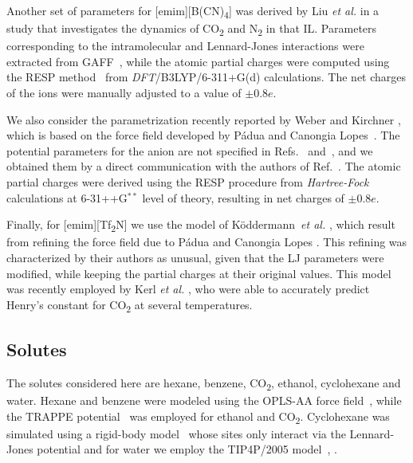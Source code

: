 \documentclass[3p,twocolumn]{elsarticle}
\begin{document}
Another set of parameters for \mbox{[emim][B(CN)\textsubscript{4}]} was derived by Liu \textit{et al.}\cite{Liu_2014} in a study that investigates the dynamics of CO\textsubscript{2} and N\textsubscript{2} in that IL. Parameters corresponding to the intramolecular and Lennard-Jones interactions were extracted from GAFF~\cite{Wang_2004}, while the atomic partial charges were computed using the RESP method~\cite{Bayly_1993} from \textit{DFT}/B3LYP/6-311+G(d) calculations. The net charges of the ions were manually adjusted to a value of $\pm$0.8$e$.

We also consider the parametrization recently reported by Weber and Kirchner \cite{Weber_2016}, which is based on the force field developed by P{\'{a}}dua and Canongia Lopes~\cite{Canongia_Lopes_2006}. The potential parameters for the anion are not specified in Refs.~ and~, and we obtained them by a direct communication with the authors of Ref.~. The atomic partial charges were derived using the RESP procedure from \textit{Hartree-Fock} calculations at 6-31++G$^{\ast \ast}$ level of theory, resulting in net charges of $\pm$0.8$e$.

Finally, for [emim][Tf\textsubscript{2}N] we use the model of K\"{o}ddermann~\textit{et al.} \cite{K_ddermann_2007}, which result from refining the force field due to P{\'{a}}dua and Canongia Lopes \cite{Canongia_Lopes_2006}. This refining was characterized by their authors as unusual, given that the LJ parameters were modified, while keeping the partial charges at their original values. This model was recently employed by Kerl \textit{et al.} \cite{Kerl__2017}, who were able to accurately predict Henry's constant for CO\textsubscript{2} at several temperatures.

\subsection{Solutes}
\label{sec:force_field_sol}

The solutes considered here are hexane, benzene, CO\textsubscript{2}, ethanol, cyclohexane and water. Hexane and benzene were modeled using the OPLS-AA force field~\cite{Jorgensen_1996}, while the TRAPPE potential~\cite{Chen_2001,Potoff_2001} was employed for ethanol and CO\textsubscript{2}. Cyclohexane was simulated using a rigid-body model~\cite{munoz2015lennard} whose sites only interact via the Lennard-Jones potential and for water we employ the TIP4P/2005 model~\cite{Abascal_2005}, \cite{Vega_2011}. 
\end{document}
